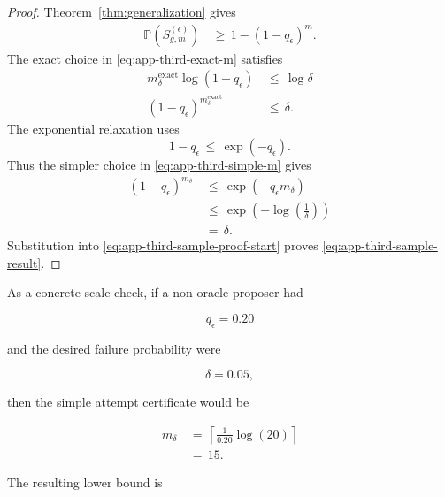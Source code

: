 \documentclass{article} %
\begin{document}
\begin{proof}
Theorem~\ref{thm:generalization} gives
\begin{align}
\label{eq:app-third-sample-proof-start}
\mathbb{P}\!\left(
S_{g,m}^{(\epsilon)}
\right)
&\,\ge\,
1-(1-q_{\epsilon})^{m}.
\end{align}
The exact choice in \eqref{eq:app-third-exact-m} satisfies
\begin{align}
\label{eq:app-third-sample-proof-exact}
m_{\delta}^{\mathrm{exact}}
\log(1-q_{\epsilon})
&\,\le\,
\log \delta
\\
(1-q_{\epsilon})^{m_{\delta}^{\mathrm{exact}}}
&\,\le\,
\delta.
\end{align}
The exponential relaxation uses
\begin{equation}
\label{eq:app-third-log-relax}
1-q_{\epsilon}
\,\le\,
\exp(-q_{\epsilon}).
\end{equation}
Thus the simpler choice in \eqref{eq:app-third-simple-m} gives
\begin{align}
\label{eq:app-third-sample-proof-simple}
(1-q_{\epsilon})^{m_{\delta}}
&\,\le\,
\exp(-q_{\epsilon}m_{\delta})
\\
&\,\le\,
\exp\!\left(
-\log\!\left(\frac{1}{\delta}\right)
\right)
\\
&\,=\,
\delta.
\end{align}
Substitution into \eqref{eq:app-third-sample-proof-start} proves \eqref{eq:app-third-sample-result}.
\end{proof}

As a concrete scale check, if a non-oracle proposer had

\begin{equation}
\label{eq:app-third-example-q}
q_{\epsilon}
=
0.20
\end{equation}

and the desired failure probability were

\begin{equation}
\label{eq:app-third-example-delta}
\delta
=
0.05,
\end{equation}

then the simple attempt certificate would be

\begin{align}
\label{eq:app-third-example-m}
m_{\delta}
&\,=\,
\left\lceil
\frac{1}{0.20}\log(20)
\right\rceil
\\
&\,=\,
15.
\end{align}

The resulting lower bound is
\end{document}
